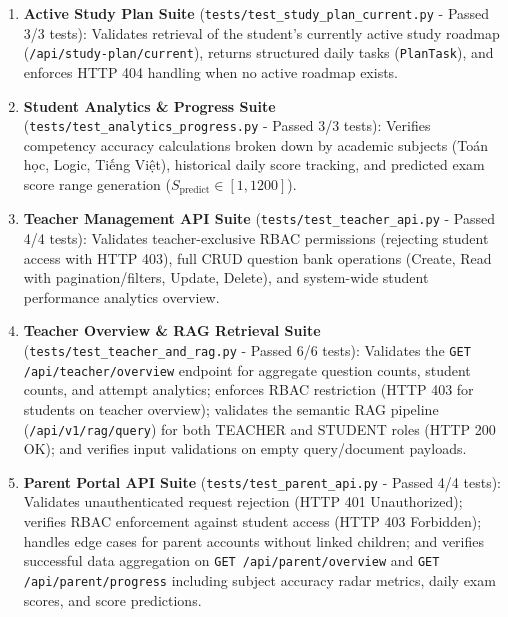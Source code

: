 \documentclass[12pt,a4paper]{article}
\begin{document}
\begin{enumerate}[leftmargin=1.5em, itemsep=0.2em]
    \item \textbf{Active Study Plan Suite} (\texttt{tests/test\_study\_plan\_current.py} - Passed 3/3 tests): Validates retrieval of the student's currently active study roadmap (\texttt{/api/study-plan/current}), returns structured daily tasks (\texttt{PlanTask}), and enforces HTTP 404 handling when no active roadmap exists.
    \item \textbf{Student Analytics \& Progress Suite} (\texttt{tests/test\_analytics\_progress.py} - Passed 3/3 tests): Verifies competency accuracy calculations broken down by academic subjects (Toán học, Logic, Tiếng Việt), historical daily score tracking, and predicted exam score range generation ($S_{\text{predict}} \in [1, 1200]$).
    \item \textbf{Teacher Management API Suite} (\texttt{tests/test\_teacher\_api.py} - Passed 4/4 tests): Validates teacher-exclusive RBAC permissions (rejecting student access with HTTP 403), full CRUD question bank operations (Create, Read with pagination/filters, Update, Delete), and system-wide student performance analytics overview.
    \item \textbf{Teacher Overview \& RAG Retrieval Suite} (\texttt{tests/test\_teacher\_and\_rag.py} - Passed 6/6 tests): Validates the \texttt{GET /api/teacher/overview} endpoint for aggregate question counts, student counts, and attempt analytics; enforces RBAC restriction (HTTP 403 for students on teacher overview); validates the semantic RAG pipeline (\texttt{/api/v1/rag/query}) for both TEACHER and STUDENT roles (HTTP 200 OK); and verifies input validations on empty query/document payloads.
    \item \textbf{Parent Portal API Suite} (\texttt{tests/test\_parent\_api.py} - Passed 4/4 tests): Validates unauthenticated request rejection (HTTP 401 Unauthorized); verifies RBAC enforcement against student access (HTTP 403 Forbidden); handles edge cases for parent accounts without linked children; and verifies successful data aggregation on \texttt{GET /api/parent/overview} and \texttt{GET /api/parent/progress} including subject accuracy radar metrics, daily exam scores, and score predictions.
\end{enumerate}
\end{document}
